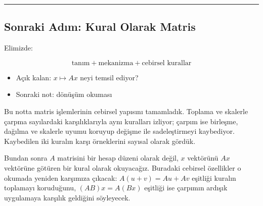 \documentclass[
  letterpaper,
  DIV=11,
  numbers=noendperiod]{scrartcl}
\providecommand{\tightlist}{%
  \setlength{\itemsep}{0pt}\setlength{\parskip}{0pt}}
\begin{document}
\begin{center}\rule{0.5\linewidth}{0.5pt}\end{center}

\subsection{Sonraki Adım: Kural Olarak
Matris}\label{sonraki-adux131m-kural-olarak-matris}

Elimizde:

\[
\text{tanım}+\text{mekanizma}+\text{cebirsel kurallar}
\]

\begin{itemize}
\tightlist
\item
  Açık kalan: \(x\mapsto Ax\) neyi temsil ediyor?
\item
  Sonraki not: dönüşüm okuması
\end{itemize}

Bu notta matris işlemlerinin cebirsel yapısını tamamladık. Toplama ve
skalerle çarpma sayılardaki karşılıklarıyla aynı kuralları izliyor;
çarpım ise birleşme, dağılma ve skalerle uyumu koruyup değişme ile
sadeleştirmeyi kaybediyor. Kaybedilen iki kuralın karşı örneklerini
sayısal olarak gördük.

Bundan sonra \(A\) matrisini bir hesap düzeni olarak değil, \(x\)
vektörünü \(Ax\) vektörüne götüren bir kural olarak okuyacağız. Buradaki
cebirsel özellikler o okumada yeniden karşımıza çıkacak:
\(A(u+v)=Au+Av\) eşitliği kuralın toplamayı koruduğunu, \((AB)x=A(Bx)\)
eşitliği ise çarpımın ardışık uygulamaya karşılık geldiğini söyleyecek.
\end{document}
